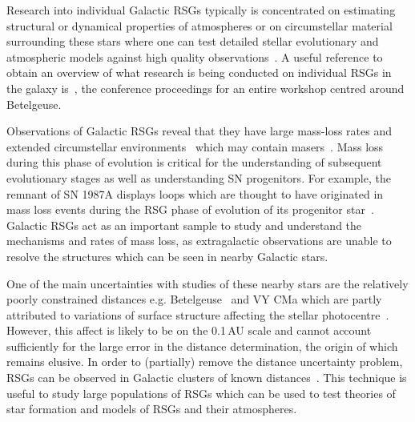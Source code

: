 
Research into individual Galactic RSGs typically is concentrated on estimating structural or dynamical properties of atmospheres or on circumstellar material surrounding these stars where one can test detailed stellar evolutionary and atmospheric models against high quality observations~\citep[e.g.][]{2014A&A...561A..15C}.
A useful reference to obtain an overview of what research is being conducted on individual RSGs in the galaxy is~\cite{2013EAS....60.....K}, the conference proceedings for an entire workshop centred around Betelgeuse.

Observations of Galactic RSGs reveal that they have large mass-loss rates
\citep[10$^{-(6\pm 1)}$\,M$_{\odot}$\,yr$^{-1}$;][]{Danchi94, Richards13,2016AJ....151...51S} and extended circumstellar environments~\citep{Smith01,2014MNRAS.437L...1W} which may contain masers~\citep[e.g.][]{Schuster06,2012ApJ...744...23Z}.
Mass loss during this phase of evolution is critical for the understanding of subsequent evolutionary stages as well as understanding SN progenitors.
For example, the remnant of SN 1987A displays loops which are thought to have originated in mass loss events during the RSG phase of evolution of its progenitor star~\citep[][and references therein]{Humphreys13}.
Galactic RSGs act as an important sample to study and understand the mechanisms and rates of mass loss, as extragalactic observations are unable to resolve the structures which can be seen in nearby Galactic stars.

One of the main uncertainties with studies of these nearby stars are the relatively poorly constrained distances e.g. Betelgeuse~\citep[197\,$\pm$\,45\,pc;][]{Harper08} and VY CMa
\citep[$\sim$1300\,$\pm$\,120\,pc;][]{Wittowski12,2012ApJ...744...23Z} which are partly attributed to variations of surface structure affecting the stellar photocentre~\citep{2011A&A...528A.120C}.
However, this affect is likely to be on the 0.1\,AU scale and cannot account sufficiently for the large error in the distance determination, the origin of which remains elusive.
In order to (partially) remove the distance uncertainty problem, RSGs can be observed in Galactic clusters of known distances~\citep[e.g.][]{Humphreys78, Mel'Nik95,2014ApJ...788...58G}.
This technique is useful to study large populations of RSGs which can be used to test theories of star formation and models of RSGs and their atmospheres.

